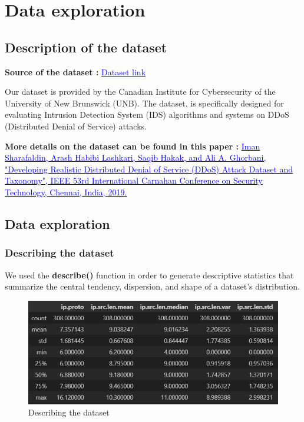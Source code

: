 \chapter{Data exploration}

\thispagestyle{empty}

\section{Description of the dataset}
\textbf{Source of the dataset :}  \href{https://github.com/doriguzzi/lucid-ddos/blob/master/sample-dataset/README.md}{\textcolor{blue}{\underline{Dataset link}}}

Our dataset is provided by the Canadian Institute for Cybersecurity of the University of New Brunswick (UNB). 
The dataset, is specifically designed for evaluating Intrusion Detection System (IDS) algorithms and systems on DDoS (Distributed Denial of Service) attacks.

\linebreak\textbf{More details on the dataset can be found in this paper :} 
\href{https://www.researchgate.net/publication/336953914_Developing_Realistic_Distributed_Denial_of_Service_DDoS_Attack_Dataset_and_Taxonomy}{\textcolor{blue}{Iman Sharafaldin, Arash Habibi Lashkari, Saqib Hakak, and Ali A. Ghorbani, "Developing Realistic Distributed Denial of Service (DDoS) Attack Dataset and Taxonomy", IEEE 53rd International Carnahan Conference on Security Technology, Chennai, India, 2019.}}

\section{Data exploration}
\subsection{Describing the dataset}
We used the \textbf{describe()} function in order to generate descriptive statistics that summarize the central tendency, dispersion, and shape of a dataset's distribution. 
\begin{figure}[h]
	\centering
	\includegraphics[width=1\textwidth]{./assets/images/describe.png}
	\caption{Describing the dataset}
\end{figure}


